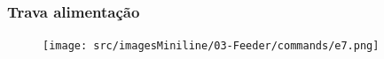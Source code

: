 \newpage
\thispagestyle{fancy}
\vspace*{40 pt}
\subsubsection{\small{Trava alimentação}}\label{miniTelaComandoAlimentacaoTravaAlimentacao}
\vspace*{\fill}
\begin{figure}[h]
  \centering
  \texttt{[image: src/imagesMiniline/03-Feeder/commands/e7.png]}
\end{figure}
\vspace*{\fill}